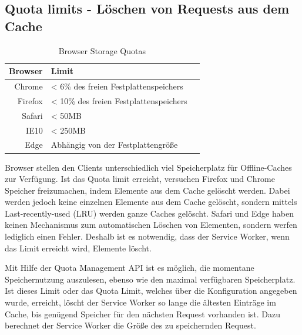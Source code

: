 \begin{description}

\section{Quota limits - Löschen von Requests aus dem Cache}\label{i:quotas}
\begin{table}[!htb]
	\begin{center}


	\begin{tabular}{|r|l|l|}
		\hline
		Browser	& Limit \\ \hline
		Chrome & < 6\% des freien Festplattenspeichers \\ \hline
		Firefox & < 10\% des freien Festplattenspeichers \\ \hline
		Safari & < 50MB \\ \hline
		IE10 & < 250MB \\ \hline
		Edge & Abhängig von der Festplattengröße \\ 
		\hline
	\end{tabular}
	\caption{Browser Storage Quotas\cite{offline-pwa}}

\end{center}
\end{table}

Browser stellen den Clients unterschiedlich viel Speicherplatz für Offline-Caches zur Verfügung. Ist das Quota limit erreicht, versuchen Firefox und Chrome Speicher freizumachen, indem Elemente aus dem Cache gelöscht werden. Dabei werden jedoch keine einzelnen Elemente aus dem Cache gelöscht, sondern mittels Last-recently-used (LRU) werden ganze Caches gelöscht. Safari und Edge haben keinen Mechanismus zum automatischen Löschen von Elementen, sondern werfen lediglich einen Fehler.\cite{offline-pwa} Deshalb ist es notwendig, dass der Service Worker, wenn das Limit erreicht wird, Elemente löscht.

Mit Hilfe der Quota Management API\cite{quota-api-ff} ist es möglich, die momentane Speichernutzung auszulesen, ebenso wie den maximal verfügbaren Speicherplatz. Ist dieses Limit oder das Quota Limit, welches über die Konfiguration angegeben wurde, erreicht, löscht der Service Worker so lange die ältesten Einträge im Cache, bis genügend Speicher für den nächsten Request vorhanden ist. Dazu berechnet der Service Worker die Größe des zu speichernden Request. 


\end{description}
